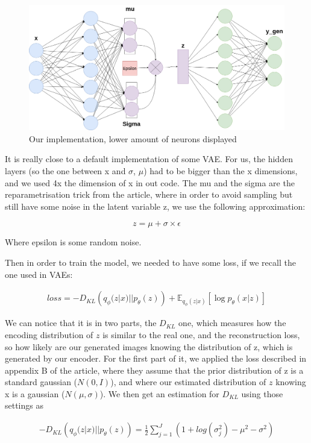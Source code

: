 \documentclass{article} %
\begin{document}
\begin{figure}
  \centering
  \includegraphics[width=1.0\textwidth]{model}
  \caption{Our implementation, lower amount of neurons displayed}
\end{figure}

It is really close to a default implementation of some VAE. For us, the hidden
layers (so the one between x and $\sigma$, $\mu$) had to be bigger than the x
dimensions, and we used 4x the dimension of x in out code. The mu and the sigma
are the reparametrisation trick from the article, where in order to avoid
sampling but still have some noise in the latent variable z, we use the
following approximation:

$$z = \mu + \sigma \times \epsilon$$

Where epsilon is some random noise.

Then in order to train the model, we needed to have some loss, if we recall the
one used in VAEs:

\begin{align}\label{loss1}
  loss =-D_{KL}\left(
  q_\phi(z|x)||p_\theta(z) \right)+\mathbb{E}_{q_\phi(z|x)}\left[ \log p_\theta(x|z) \right]
\end{align}

We can notice that it is in two parts, the $D_{KL}$ one, which measures how the
encoding distribution of $z$ is similar to the real one, and the reconstruction
loss, so how likely are our generated images knowing the distribution of z,
which is generated by our encoder. For the first part of it, we applied the loss
described in appendix B of the article, where they assume that the prior distribution
of z is a standard gaussian ($N(0, I)$), and where our estimated distribution of
$z$ knowing x is a gaussian ($N(\mu, \sigma)$). We then get an estimation for
$D_{KL}$ using those settings as

\begin{align}\label{loss1}
  -D_{KL}\left(q_\phi(z|x)||p_\theta(z) \right) = \frac{1}{2} \sum\limits_{j=1}^J (1 + log(\sigma_j^2) - \mu^2 - \sigma^2)
\end{align}
\end{document}
